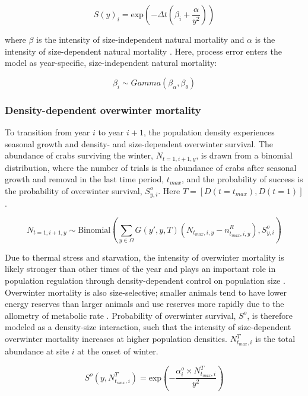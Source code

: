 \documentclass{article}
\begin{document}
\begin{equation}
S(y)_i = \text{exp}\left(-\Delta t(\beta_i+\frac{\alpha}{y^2})\right)
\end{equation}

where $\beta$ is the intensity of size-independent natural mortality and $\alpha$ is the intensity of size-dependent natural mortality \parencite{carlson2010bayesian}. Here, process error enters the model as year-specific, size-independent natural mortality:

\begin{equation}
\beta_i \sim Gamma(\beta_{\alpha}, \beta_{\theta})
\end{equation}

\subsubsection*{Density-dependent overwinter mortality}

To transition from year $i$ to year $i+1$, the population density experiences seasonal growth and density- and size-dependent overwinter survival. The abundance of crabs surviving the winter, $N_{t=1,i+1,y}$, is drawn from a binomial distribution, where the number of trials is the abundance of crabs after seasonal growth and removal in the last time period, $t_{max}$, and the probability of success is the probability of overwinter survival, $S^o_{y,i}$. Here $T=[D(t=t_{max}), D(t=1)]$. 

\begin{equation}
N_{t=1,i+1,y} \sim \text{Binomial}\left( \sum_{y \in \Omega} G(y',y, T) (N_{t_{max},i,y} - n^R_{t_{max},i,y}),  S^o_{y,i}\right)
\end{equation}

Due to thermal stress and starvation, the intensity of overwinter mortality is likely stronger than other times of the year and plays an important role in population regulation through density-dependent control on population size \parencite{henderson1988size}. Overwinter mortality is also size-selective; smaller animals tend to have lower energy reserves than larger animals and use reserves more rapidly due to the allometry of metabolic rate \parencite{hurst2007causes}. Probability of overwinter survival, $S^o$, is therefore modeled as a density-size interaction, such that the intensity of size-dependent overwinter mortality increases at higher population densities. $N^T_{t_{max},i}$ is the total abundance at site $i$ at the onset of winter.

\begin{equation}
S^o(y,N^T_{t_{max},i}) = \text{exp}\left(-\frac{\alpha_i^o \times N^T_{t_{max},i}}{y^2}\right)
\end{equation}
\end{document}
